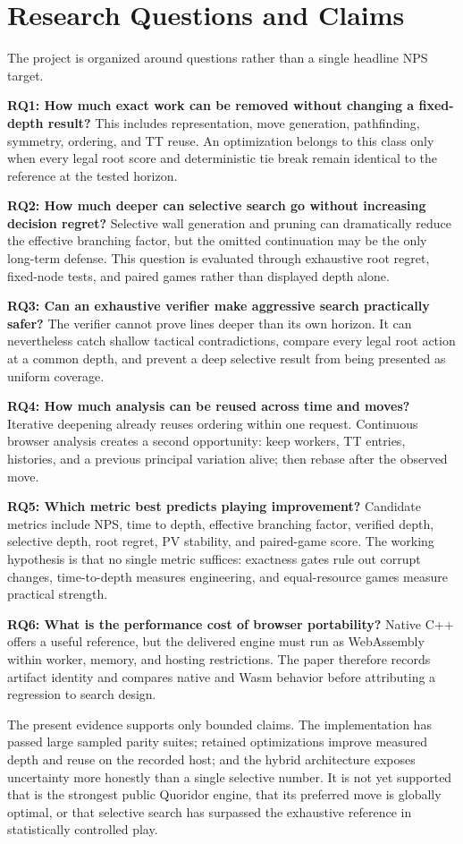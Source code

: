 \section{Research Questions and Claims}
The project is organized around questions rather than a single headline NPS target.

\textbf{RQ1: How much exact work can be removed without changing a fixed-depth result?} This includes representation, move generation, pathfinding, symmetry, ordering, and TT reuse. An optimization belongs to this class only when every legal root score and deterministic tie break remain identical to the reference at the tested horizon.

\textbf{RQ2: How much deeper can selective search go without increasing decision regret?} Selective wall generation and pruning can dramatically reduce the effective branching factor, but the omitted continuation may be the only long-term defense. This question is evaluated through exhaustive root regret, fixed-node tests, and paired games rather than displayed depth alone.

\textbf{RQ3: Can an exhaustive verifier make aggressive search practically safer?} The verifier cannot prove lines deeper than its own horizon. It can nevertheless catch shallow tactical contradictions, compare every legal root action at a common depth, and prevent a deep selective result from being presented as uniform coverage.

\textbf{RQ4: How much analysis can be reused across time and moves?} Iterative deepening already reuses ordering within one request. Continuous browser analysis creates a second opportunity: keep workers, TT entries, histories, and a previous principal variation alive; then rebase after the observed move.

\textbf{RQ5: Which metric best predicts playing improvement?} Candidate metrics include NPS, time to depth, effective branching factor, verified depth, selective depth, root regret, PV stability, and paired-game score. The working hypothesis is that no single metric suffices: exactness gates rule out corrupt changes, time-to-depth measures engineering, and equal-resource games measure practical strength.

\textbf{RQ6: What is the performance cost of browser portability?} Native C++ offers a useful reference, but the delivered engine must run as WebAssembly within worker, memory, and hosting restrictions. The paper therefore records artifact identity and compares native and Wasm behavior before attributing a regression to search design.

The present evidence supports only bounded claims. The implementation has passed large sampled parity suites; retained optimizations improve measured depth and reuse on the recorded host; and the hybrid architecture exposes uncertainty more honestly than a single selective number. It is not yet supported that \walwuk{} is the strongest public Quoridor engine, that its preferred move is globally optimal, or that selective search has surpassed the exhaustive reference in statistically controlled play.
